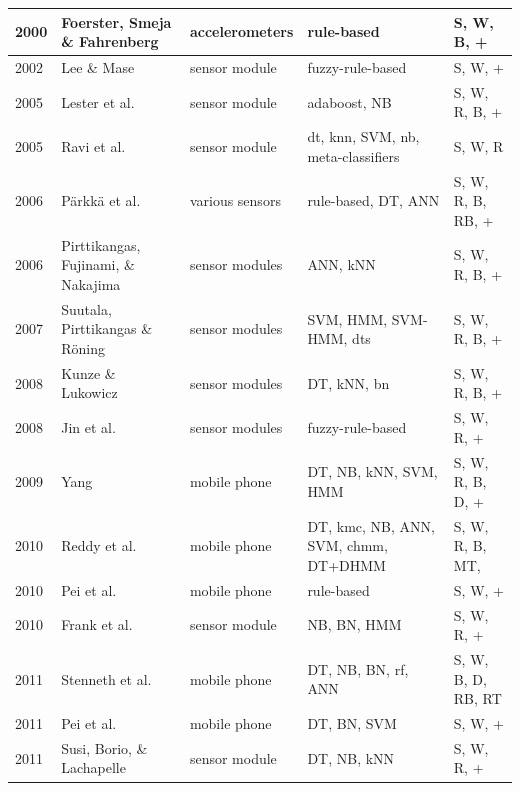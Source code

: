 \begin{center}
\begin{longtable} {|l|>{\raggedright}p{3cm}|p{2.4cm}|>{\centering\arraybackslash}p{2.5cm}|>{\centering\arraybackslash}p{2.2cm}|}
2000 & Foerster, Smeja \& Fahrenberg \cite{foerster2000motion} & accelerometers & rule-based & S, W, B, + \\ \hline
2002 & Lee \& Mase \cite{lee2002activity} & sensor module & fuzzy-rule-based & S, W, + \\ \hline
2005 & Lester et al. \cite{lester2005hybrid} & sensor module & \acrshort{adaboost}, NB & S, W, R, B, + \\ \hline
2005 & Ravi et al. \cite{Ravi2005} & sensor module & \acrshort{dt}, \acrshort{knn}, SVM, \acrshort{nb}, meta-classifiers& S, W, R\\ \hline
2006 & P\"{a}rkk\"{a} et al. \cite{parkka2006activity} & various sensors & rule-based, DT, ANN & S, W, R, B, RB, + \\ \hline
2006 & Pirttikangas, Fujinami, \& Nakajima \cite{pirttikangas2006feature} & sensor modules & ANN, kNN & S, W, R, B, + \\ \hline
2007 & Suutala, Pirttikangas \& R\"{o}ning \cite{Suutula2007} & sensor modules & SVM, HMM, SVM-HMM, \acrshort{dts} & S, W, R, B, + \\ \hline
2008 & Kunze \& Lukowicz \cite{kunze2008dealing} & sensor modules & DT, kNN, \acrshort{bn} & S, W, R, B, + \\ \hline
2008 & Jin et al. \cite{yin2008sensor} & sensor modules & fuzzy-rule-based & S, W, R, + \\ \hline
2009 & Yang \cite{yang2009toward} & mobile phone & DT, NB, kNN, SVM, HMM & S, W, R, B, D, + \\ \hline
2010 & Reddy et al. \cite{Reddy2010} & mobile phone & DT, \acrshort{kmc}, NB, ANN, SVM, \acrshort{chmm}, DT+DHMM & S, W, R, B, MT,  \\ \hline 
2010 & Pei et al. \cite{Pei2010} & mobile phone & rule-based &  S, W, + \\ \hline
2010 & Frank et al. \cite{Frank2010}& sensor module & NB, BN, HMM & S, W, R, + \\ \hline
2011 & Stenneth et al. \cite{Stenneth2011}& mobile phone  & DT, NB, BN, \acrshort{rf}, ANN & S, W, B, D, RB, RT \\ \hline
2011 & Pei et al. \cite{pei2011using} & mobile phone & DT, BN, SVM & S, W, + \\ \hline
2011 & Susi, Borio, \& Lachapelle \cite{susi2011accelerometer} & sensor module & DT, NB, kNN & S, W, R, +\\ \hline

\end{longtable}
\end{center}
